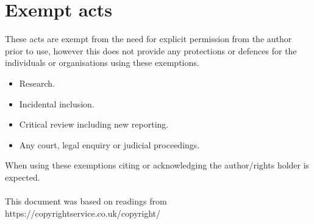 \documentclass[12pt,draft]{article}
\begin{document}
\section{Exempt acts}
These acts are exempt from the need for explicit permission from the author prior to use, however this does not provide any protections or defences for the individuals or organisations using these exemptions.
\begin{itemize}
	\item Research.
	\item Incidental inclusion.
	\item Critical review including new reporting.
	\item Any court, legal enquiry or judicial proceedings.
\end{itemize}
When using these exemptions citing or acknowledging the author/rights holder is expected.
\\\\
This document was based on readings from https://copyrightservice.co.uk/copyright/
\end{document}
